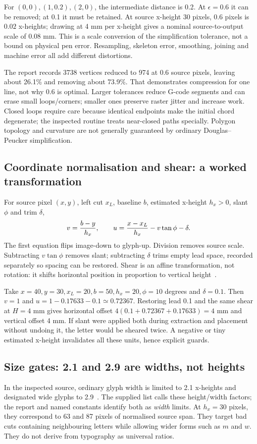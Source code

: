 For $(0,0),(1,0.2),(2,0)$, the intermediate distance is 0.2. At
$\epsilon=0.6$ it can be removed; at 0.1 it must be retained. At source
x-height 30 pixels, 0.6 pixels is $0.02$ x-heights; drawing at 4 mm per
x-height gives a nominal source-to-output scale of 0.08 mm. This is a
scale conversion of the simplification tolerance, not a bound on physical
pen error. Resampling, skeleton error, smoothing, joining and machine error
all add different distortions.

The report records 3738 vertices reduced to 974 at 0.6 source pixels,
leaving about 26.1\% and removing about 73.9\%. That demonstrates compression
for one line, not why 0.6 is optimal. Larger tolerances reduce G-code segments
and can erase small loops/corners; smaller ones preserve raster jitter and
increase work. Closed loops require care because identical endpoints make
the initial chord degenerate; the inspected routine treats near-closed paths
specially. Polygon topology and curvature are not generally guaranteed by
ordinary Douglas--Peucker simplification.

\subsection{Coordinate normalisation and shear: a worked transformation}
For source pixel $(x,y)$, left cut $x_L$, baseline $b$, estimated x-height
$h_x>0$, slant $\phi$ and trim $\delta$,
\[
v={b-y\over h_x},\qquad u={x-x_L\over h_x}-v\tan\phi-\delta.
\]
The first equation flips image-down to glyph-up. Division removes source
scale. Subtracting $v\tan\phi$ removes slant; subtracting $\delta$ trims
empty lead space, recorded separately so spacing can be restored. Shear is
an affine transformation, not rotation: it shifts horizontal position in
proportion to vertical height~\cite{wolberg1990}.

Take $x=40,y=30,x_L=20,b=50,h_x=20,\phi=10$ degrees and $\delta=0.1$.
Then $v=1$ and $u=1-0.17633-0.1\simeq0.72367$. Restoring lead 0.1
and the same shear at $H=4$ mm gives horizontal offset
$4(0.1+0.72367+0.17633)=4$ mm and vertical offset 4 mm.
If slant were applied both during extraction and placement without undoing
it, the letter would be sheared twice. A negative or tiny estimated x-height
invalidates all these units, hence explicit guards.

\subsection{Size gates: 2.1 and 2.9 are widths, not heights}
In the inspected source, ordinary glyph width is limited to 2.1 x-heights
and designated wide glyphs to 2.9~\cite{code2026}. The supplied list calls
these height/width factors; the report and named constants identify both
as \emph{width} limits. At $h_x=30$ pixels, they correspond to 63 and 87
pixels of normalised source span. They target bad cuts containing neighbouring
letters while allowing wider forms such as $m$ and $w$. They do not derive
from typography as universal ratios.

